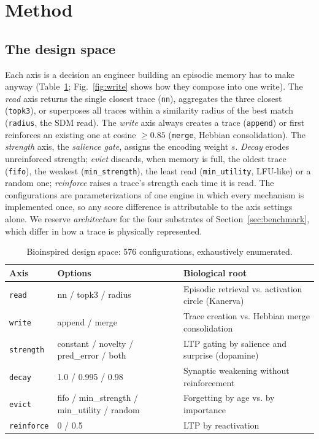 \documentclass[conference]{IEEEtran}
\begin{document}
\section{Method}
\label{sec:nas}

\subsection{The design space}

Each axis is a decision an engineer building an episodic memory has to make
anyway (Table~\ref{tab:axes}; Fig.~\ref{fig:write} shows how they compose into
one write). The \emph{read} axis returns the single closest
trace (\texttt{nn}), aggregates the three closest (\texttt{topk3}), or
superposes all traces within a similarity radius of the best match
(\texttt{radius}, the SDM read). The \emph{write} axis always creates a trace
(\texttt{append}) or first reinforces an existing one at cosine
$\geq 0.85$ (\texttt{merge}, Hebbian consolidation). The \emph{strength} axis,
the \emph{salience gate}, assigns the encoding weight $s$. \emph{Decay} erodes
unreinforced strength; \emph{evict} discards, when memory is full, the oldest
trace (\texttt{fifo}), the weakest (\texttt{min\_strength}), the least read
(\texttt{min\_utility}, LFU-like) or a random one; \emph{reinforce} raises a
trace's strength each time it is read. The
 configurations are
parameterizations of one engine in which every mechanism is implemented once,
so any score difference is attributable to the axis settings alone. We reserve
\emph{architecture} for the four substrates of Section~\ref{sec:benchmark},
which differ in how a trace is physically represented.

\begin{table}[t]
\centering
\caption{Bioinspired design space: 576 configurations, exhaustively enumerated.}
\label{tab:axes}
\begin{tabular}{p{1.5cm}p{2.6cm}p{3.3cm}}
\hline
Axis & Options & Biological root \\
\hline
\texttt{read} & nn / topk3 / radius & Episodic retrieval vs. activation circle
(Kanerva) \\
\texttt{write} & append / merge & Trace creation vs. Hebbian merge
consolidation \\
\texttt{strength} & constant / novelty / pred\_error / both & LTP gating by
salience and surprise (dopamine) \\
\texttt{decay} & 1.0 / 0.995 / 0.98 & Synaptic weakening without reinforcement \\
\texttt{evict} & fifo / min\_strength / min\_utility / random & Forgetting by age
vs. by importance \\
\texttt{reinforce} & 0 / 0.5 & LTP by reactivation \\
\hline
\end{tabular}
\end{table}
\end{document}
